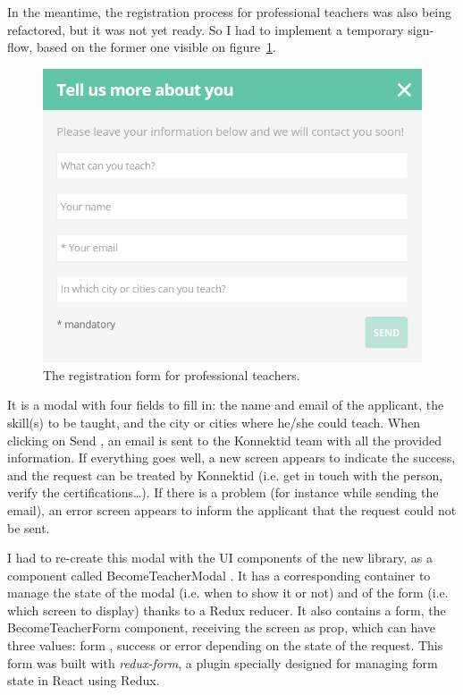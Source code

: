In the meantime, the registration process for professional teachers was also being refactored, but it was not yet ready. So I had to implement a temporary sign-flow, based on the former one visible on {\sc figure}~\ref{fig:signUpFlow}.

 \begin{figure}[H]
    \centering
    \includegraphics[scale=0.6]{figure/signUpFlow.png}
    \caption{The registration form for professional teachers.}
    \label{fig:signUpFlow}
\end{figure}

It is a modal with four fields to fill in: the name and email of the applicant, the skill(s) to be taught, and the city or cities where he/she could teach. When clicking on \guillemotleft{} Send \guillemotright{}, an email is sent to the Konnektid team with all the provided information. If everything goes well, a new screen appears to indicate the success, and the request can be treated by Konnektid (i.e. get in touch with the person, verify the certifications\ldots). If there is a problem (for instance while sending the email), an error screen appears to inform the applicant that the request could not be sent.

I had to re-create this modal with the UI components of the new library, as a component called \guillemotleft{} BecomeTeacherModal \guillemotright{}. It has a corresponding container to manage the state of the modal (i.e. when to show it or not) and of the form (i.e. which screen to display) thanks to a Redux reducer. It also contains a form, the \guillemotleft{} BecomeTeacherForm \guillemotright{} component, receiving the screen as prop, which can have three values: \guillemotleft{} form \guillemotright{}, \guillemotleft{} success \guillemotright{} or \guillemotleft{} error \guillemotright{} depending on the state of the request. This form was built with \textit{redux-form}, a plugin specially designed for managing form state in React using Redux.

